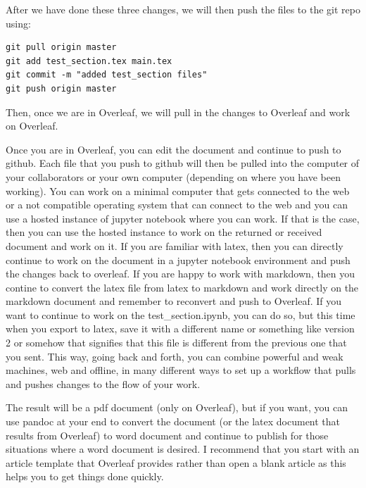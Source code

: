 After we have done these three changes, we will then push the files to
the git repo using:

\begin{verbatim}
git pull origin master
git add test_section.tex main.tex
git commit -m "added test_section files"
git push origin master
\end{verbatim}

Then, once we are in Overleaf, we will pull in the changes to Overleaf
and work on Overleaf.

Once you are in Overleaf, you can edit the document and continue to push
to github. Each file that you push to github will then be pulled into
the computer of your collaborators or your own computer (depending on
where you have been working). You can work on a minimal computer that
gets connected to the web or a not compatible operating system that can
connect to the web and you can use a hosted instance of jupyter notebook
where you can work. If that is the case, then you can use the hosted
instance to work on the returned or received document and work on it. If
you are familiar with latex, then you can directly continue to work on
the document in a jupyter notebook environment and push the changes back
to overleaf. If you are happy to work with markdown, then you contine to
convert the latex file from latex to markdown and work directly on the
markdown document and remember to reconvert and push to Overleaf. If you
want to continue to work on the test\_section.ipynb, you can do so, but
this time when you export to latex, save it with a different name or
something like version 2 or somehow that signifies that this file is
different from the previous one that you sent. This way, going back and
forth, you can combine powerful and weak machines, web and offline, in
many different ways to set up a workflow that pulls and pushes changes
to the flow of your work.

The result will be a pdf document (only on Overleaf), but if you want,
you can use pandoc at your end to convert the document (or the latex
document that results from Overleaf) to word document and continue to
publish for those situations where a word document is desired. I
recommend that you start with an article template that Overleaf provides
rather than open a blank article as this helps you to get things done
quickly.

\begin{Shaded}
\end{Shaded}

